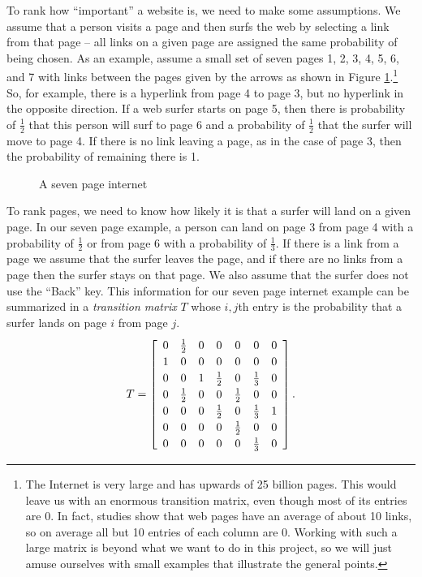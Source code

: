 To rank how ``important'' a website is, we need to make some assumptions. We assume that a person visits a page and then surfs the web by selecting a link from that page -- all links on a given page are assigned the same probability of being chosen. As an example, assume a small set of seven pages 1, 2, 3, 4, 5, 6, and 7 with links between the pages given by the arrows as shown in Figure \ref{F:seven_page}.\footnote{The Internet is very large and has upwards of 25 billion pages. This would leave us with an enormous transition matrix, even though most of its entries are 0. In fact, studies show that web pages have an average of about 10 links, so on average all but 10 entries of each column are 0. Working with such a large matrix is beyond what we want to do in this project, so we will just amuse ourselves with small examples that illustrate the general points.} So, for example, there is a hyperlink from page 4 to page 3, but no hyperlink in the opposite direction. If a web surfer starts on page 5, then there is probability of $\frac{1}{2}$ that this person will surf to page 6 and a probability of $\frac{1}{2}$ that the surfer will move to page 4. If there is no link leaving a page, as in the case of page 3, then the probability of remaining there is 1.


\begin{figure}[h]
\begin{center}
\caption{A seven page internet}
\label{F:seven_page}
\end{center}
\end{figure}


To rank pages, we need to know how likely it is that a surfer will land on a given page. In our seven page example, a person can land on page 3 from page 4 with a probability of $\frac{1}{2}$ or from page 6 with a probability of $\frac{1}{3}$. If there is a link from a page we assume that the surfer leaves the page, and if there are no links from a page then the surfer stays on that page. We also assume that the surfer does not use the ``Back'' key. This information for our seven page internet example can be summarized in a \emph{transition matrix} $T$ whose $i,j$th entry is the probability that a surfer lands on page $i$ from page $j$.
\[T= \left[ \renewcommand{\arraystretch}{1.2} \begin{array}{ccccccc} 0&\frac{1}{2}&0&0&0&0&0 \\ 1&0&0&0&0&0&0 \\ 0&0&1&\frac{1}{2}&0&\frac{1}{3}&0 \\ 0&\frac{1}{2}&0&0&\frac{1}{2}&0&0 \\ 0&0&0&\frac{1}{2}&0&\frac{1}{3}&1 \\ 0&0&0&0&\frac{1}{2}&0&0 \\ 0&0&0&0&0&\frac{1}{3}&0 \end{array} \right].\]

